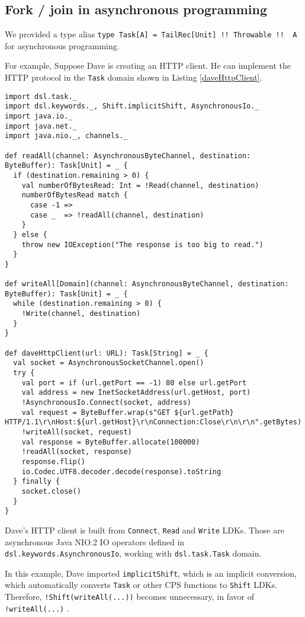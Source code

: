 \subsection{Fork / join in asynchronous programming}

We provided a type alias \lstinline{type Task[A] = TailRec[Unit] !! Throwable !!  A} for asynchronous programming.

For example, Suppose Dave is creating an HTTP client. He can implement the HTTP protocol in the \lstinline{Task} domain shown in Listing \ref{daveHttpClient}.

\begin{lstlisting}[caption={Dave's HTTP client},label={daveHttpClient}]
import dsl.task._
import dsl.keywords._, Shift.implicitShift, AsynchronousIo._
import java.io._
import java.net._
import java.nio._, channels._

def readAll(channel: AsynchronousByteChannel, destination: ByteBuffer): Task[Unit] = _ {
  if (destination.remaining > 0) {
    val numberOfBytesRead: Int = !Read(channel, destination)
    numberOfBytesRead match {
      case -1 =>
      case _  => !readAll(channel, destination)
    }
  } else {
    throw new IOException("The response is too big to read.")
  }
}

def writeAll[Domain](channel: AsynchronousByteChannel, destination: ByteBuffer): Task[Unit] = _ {
  while (destination.remaining > 0) {
    !Write(channel, destination)
  }
}

def daveHttpClient(url: URL): Task[String] = _ {
  val socket = AsynchronousSocketChannel.open()
  try {
    val port = if (url.getPort == -1) 80 else url.getPort
    val address = new InetSocketAddress(url.getHost, port)
    !AsynchronousIo.Connect(socket, address)
    val request = ByteBuffer.wrap(s"GET ${url.getPath} HTTP/1.1\r\nHost:${url.getHost}\r\nConnection:Close\r\n\r\n".getBytes)
    !writeAll(socket, request)
    val response = ByteBuffer.allocate(100000)
    !readAll(socket, response)
    response.flip()
    io.Codec.UTF8.decoder.decode(response).toString
  } finally {
    socket.close()
  }
}
\end{lstlisting}

Dave's HTTP client is built from \lstinline{Connect}, \lstinline{Read} and \lstinline{Write} LDKs. Those are asynchronous Java NIO.2 IO operators defined in \lstinline{dsl.keywords.AsynchronousIo}, working with \lstinline{dsl.task.Task} domain.

In this example, Dave imported \lstinline{implicitShift}, which is an implicit conversion, which automatically converts \lstinline{Task} or other CPS functions to \lstinline{Shift} LDKs. Therefore, \lstinline{!Shift(writeAll(...))} becomes unnecessary, in favor of \lstinline{!writeAll(...)} .

